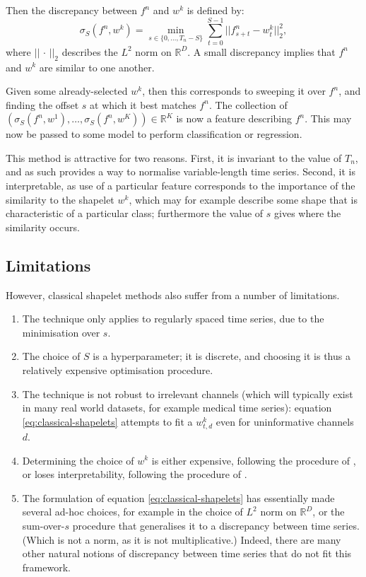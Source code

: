 \documentclass{article}
\theoremstyle{plain}
\theoremstyle{definition}
\newcommand{\reals}{\mathbb{R}}
\newcommand{\norm}[1]{\mathord|\!\mathord|#1\mathord|\!\mathord|} %
\begin{document}
	Then the discrepancy between $f^n$ and $w^{k}$ is defined by:
	\begin{equation}\label{eq:classical-shapelets}
	\sigma_S(f^n, w^{k}) = \min_{s \in \{0, \ldots, T_n - S\}} \sum_{t = 0}^{S - 1} \norm{f^n_{s + t} - w^{k}_t}_2^2,
	\end{equation}
	where $\norm{\,\cdot\,}_2$ describes the $L^2$ norm on $\reals^D$. A small discrepancy implies that $f^n$ and $w^{k}$ are similar to one another.
	
	Given some already-selected $w^{k}$, then this corresponds to sweeping it over $f^n$, and finding the offset $s$ at which it best matches $f^n$. The collection of $(\sigma_S(f^n, w^{1}), \ldots, \sigma_S(f^n, w^{K})) \in \reals^K$ is now a feature describing $f^n$. This may now be passed to some model to perform classification or regression.
	
	This method is attractive for two reasons. First, it is invariant to the value of $T_n$, and as such provides a way to normalise variable-length time series. Second, it is interpretable, as use of a particular feature corresponds to the importance of the similarity to the shapelet $w^{k}$, which may for example describe some shape that is characteristic of a particular class; furthermore the value of $s$ gives where the similarity occurs.
	
	\subsection{Limitations}
	However, classical shapelet methods also suffer from a number of limitations.
	\begin{enumerate}
	\item The technique only applies to regularly spaced time series, due to the minimisation over $s$. 
	\item The choice of $S$ is a hyperparameter; it is discrete, and choosing it is thus a relatively expensive optimisation procedure.
	\item The technique is not robust to irrelevant channels (which will typically exist in many real world datasets, for example medical time series): equation \eqref{eq:classical-shapelets} attempts to fit a $w^{k}_{t, d}$ even for uninformative channels $d$.
	\item Determining the choice of $w^{k}$ is either expensive, following the procedure of \cite{TODO}, or loses interpretability, following the procedure of \cite{TODO}.  %
	\item The formulation of equation \eqref{eq:classical-shapelets} has essentially made several ad-hoc choices, for example in the choice of $L^2$ norm on $\reals^D$, or the sum-over-$s$ procedure that generalises it to a discrepancy between time series. (Which is not a norm, as it is not multiplicative.) Indeed, there are many other natural notions of discrepancy between time series \cite{TODO, TODO, TODO, TODO} that do not fit this framework.
	\end{enumerate}
	
\end{document}
